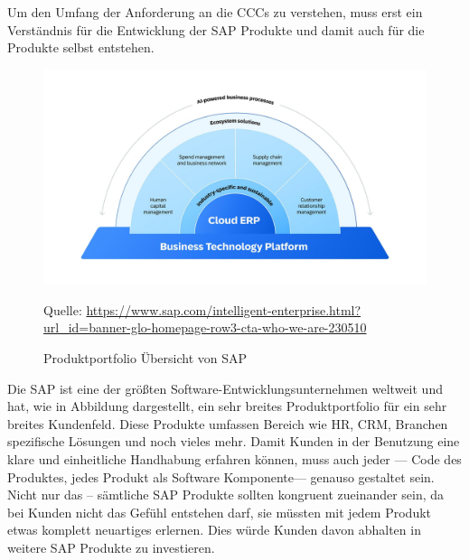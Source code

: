 \documentclass[../main.tex]{subfiles}
\begin{document}
Um den Umfang der Anforderung an die \glspl{CCC} zu verstehen, muss erst ein Verständnis für die Entwicklung der SAP Produkte und damit auch für die Produkte selbst entstehen.

\begin{figure}[ht]
    \centering
    \includegraphics[scale=.21]{"bilder/produktportfolio.jpg"}
    \caption{Produktportfolio Übersicht von SAP}
    \footnotesize Quelle: \url{https://www.sap.com/intelligent-enterprise.html?url_id=banner-glo-homepage-row3-cta-who-we-are-230510}
    \label{fig:produktportfolio}
\end{figure}

Die SAP ist eine der größten Software-Entwicklungsunternehmen weltweit und hat, wie in Abbildung  dargestellt, ein sehr breites Produktportfolio für ein sehr breites Kundenfeld.
\cite{CorporateFactSheet}
Diese Produkte umfassen Bereich wie \gls{HR}, \gls{CRM}, Branchen spezifische Lösungen und noch vieles mehr.
Damit Kunden in der Benutzung eine klare und einheitliche Handhabung erfahren können, muss auch jeder --- Code des Produktes, jedes Produkt als Software Komponente--- genauso gestaltet sein.
Nicht nur das -- sämtliche SAP Produkte sollten kongruent zueinander sein, da bei Kunden nicht das Gefühl entstehen darf, sie müssten mit jedem Produkt etwas komplett neuartiges erlernen.
Dies würde Kunden davon abhalten in weitere SAP Produkte zu investieren.
\cite{Hier ne passende quelle waere cool}
\end{document}
